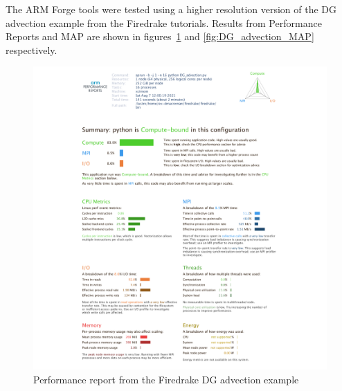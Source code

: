 \documentclass[a4paper,titlepage]{article}
\begin{document}
The ARM Forge tools were tested using a higher resolution version of the DG advection example from the Firedrake tutorials. Results from Performance Reports and MAP are shown in figures~\ref{fig:DG_advection_performanceReport} and \ref{fig:DG_advection_MAP} respectively.
%
\begin{figure}[htbp]
\begin{center}
\includegraphics[scale=0.3]{figures/DG_advection_performanceReport}
\caption{Performance report from the Firedrake DG advection example}
\label{fig:DG_advection_performanceReport}
\end{center}
\end{figure}
%
\end{document}
